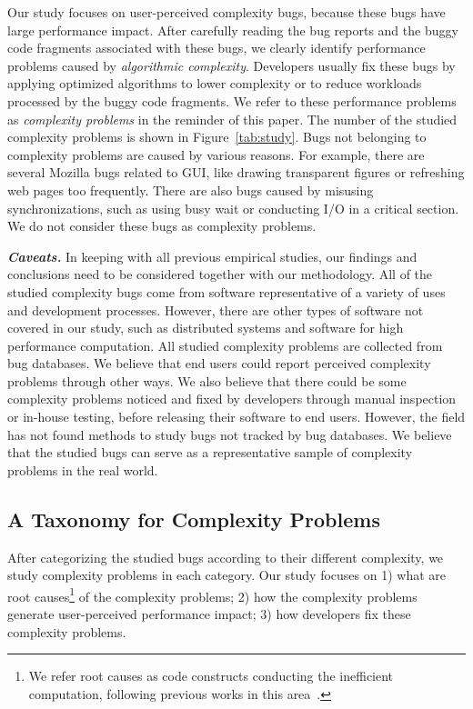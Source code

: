 Our study focuses on user-perceived complexity bugs, 
because these bugs have large performance impact.
After carefully reading the bug reports and the buggy code fragments 
associated with these bugs,
we clearly identify \ComBugs performance problems 
caused by {\textit{algorithmic complexity}}.
Developers usually fix these bugs by applying optimized algorithms to lower complexity
or to reduce workloads processed by the buggy code fragments. 
We refer to these performance problems as 
{\textit{complexity problems}} in the reminder of this paper.
The number of the studied complexity problems is shown in Figure~\ref{tab:study}.
Bugs not belonging to complexity problems are caused by various reasons.
For example, there are several Mozilla bugs related to GUI, 
like drawing transparent figures or refreshing web pages too frequently. 
There are also bugs caused by misusing synchronizations, 
such as using busy wait or conducting I/O in a critical section. 
We do not consider these bugs as complexity problems.

{\bf{\textit{Caveats.}}}
In keeping with all previous empirical studies, 
our findings and conclusions need to be considered together with our methodology.
All of the studied complexity bugs come from software representative of a variety of uses and development processes. 
However, there are other types of software not covered in our study, 
such as distributed systems and software for high performance computation. 
All studied complexity problems are collected from bug databases.  
We believe that end users could report perceived complexity problems through other ways.
We also believe that there could be some complexity problems noticed 
and fixed by developers through manual inspection or in-house testing, 
before releasing their software to end users.  
However, the field has not found methods to study bugs not tracked by bug databases.
We believe that the studied bugs can serve as a representative sample
of complexity problems in the real world. 



\subsection{A Taxonomy for Complexity Problems}
\label{sec:tax}



After categorizing the studied bugs according to their different complexity, 
we study complexity problems in each category.
Our study focuses on 
1) what are root causes\footnote{We refer root causes as code constructs 
conducting the inefficient computation, 
following previous works in this area~\cite{SongOOPSLA2014,ldoctor}.} 
of the complexity problems;
2) how the complexity problems generate user-perceived performance impact;
3) how developers fix these complexity problems. 

